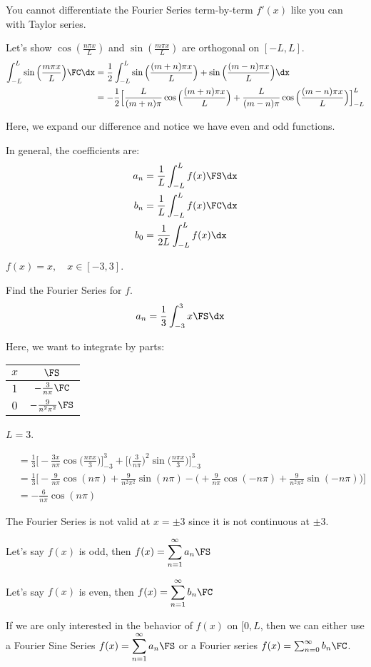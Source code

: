 \note You cannot differentiate the Fourier Series term-by-term $f'(x)$ like
you can with Taylor series.

Let's show $\cos(\frac{n \pi x}{L})$ and $\sin(\frac{m \pi x}{L})$ are
orthogonal on $[-L, L]$.
%
\begin{align}
  \int^L_{-L} \sin\Big(\frac{m \pi x}{L}\Big) \FC \dx
  & = \frac{1}{2} \int^L_{-L}
  \sin\Big( \frac{(m + n) \pi x}{L} \Big)
  + \sin\Big( \frac{(m - n) \pi x}{L} \Big) \dx\\
  & = - \frac{1}{2} \Big[ \frac{L}{(m + n) \pi}
  \cos\Big(\frac{(m + n) \pi x}{L} \Big)
  + \frac{L}{(m - n)\pi} \cos\Big( \frac{(m - n) \pi x}{L} \Big) \Big]^L_{-L}
\end{align}

Here, we expand our difference and notice we have even and odd functions.

In general, the coefficients are:
%
\begin{align}
  a_n & = \frac{1}{L} \int^L_{-L} f(x) \FS \dx\\
  b_n & = \frac{1}{L} \int^L_{-L} f(x) \FC \dx\\
  b_0 & = \frac{1}{2L} \int^L_{-L} f(x) \dx
\end{align}

\Ex $f(x) = x, \quad x \in [-3, 3]$.

Find the Fourier Series for $f$.
%
\begin{align}
  a_n & = \frac{1}{3} \int^3_{-3} x \FS \dx
\end{align}

Here, we want to integrate by parts:
%
\begin{center}
  \begin{tabular}{c|c}
    $x$ & $\FS$\\
    \hline
    $1$ & $- \frac{3}{n \pi} \FC$\\
    \hline
    $0$ & $- \frac{9}{n^2 \pi^2} \FS$
  \end{tabular}
  \note $L = 3$.
\end{center}

\begin{align}
  & = \frac{1}{3} \Big[ -\frac{3 x}{n \pi}
  \cos\Big( \frac{n \pi x}{3} \Big) \Big]^3_{-3}
  + \Big[ \Big( \frac{3}{n \pi} \Big)^2
  \sin\Big( \frac{n \pi x}{3} \Big)\Big]^3_{-3}\\
  & = \frac{1}{3} \Bigg[ -\frac{9}{n \pi} \cos(n \pi) + \frac{9}{n^2 \pi^2}
  \sin(n \pi) -
  \Big( +\frac{9}{n \pi} \cos(-n \pi)
  + \frac{9}{n^2 \pi^2} \sin(-n \pi) \Big)\Bigg]\\
  & = -\frac{6}{n \pi} \cos(n \pi)
\end{align}

The Fourier Series is not valid at $x = \pm 3$ since it is not continuous at $\pm 3$.

Let's say $f(x)$ is odd, then $\displaystyle f(x) = \sum^\infty_{n = 1} a_n \FS$

Let's say $f(x)$ is even, then $\displaystyle f(x) = \sum^\infty_{n = 1} b_n \FC$

If we are only interested in the behavior of $f(x)$ on $[0, L$, then we can either use a Fourier Sine Series $\displaystyle f(x) = \sum^\infty_{n = 1} a_n \FS$ or a Fourier series $f(x) = \sum^\infty_{n = 0} b_n \FC$.

